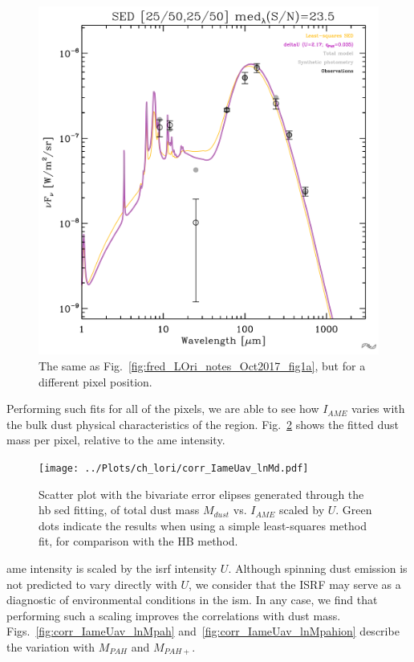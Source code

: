               \begin{figure}
                \includegraphics[width=\textwidth]{../Plots/ch_lori/fred_LOri_notes_Oct2017_fig1b.pdf}
                \centering
                \caption{The same as Fig.~\ref{fig:fred_LOri_notes_Oct2017_fig1a}, but for a different pixel position.}
                \label{fig:fred_LOri_notes_Oct2017_fig1b}
              \end{figure}
           Performing such fits for all of the pixels, we are able to see how $I_{AME}$ varies with the bulk dust physical characteristics of the region. Fig.~\ref{fig:corr_IameUav_lnMd} shows the fitted dust mass per pixel, relative to the \acrshort{ame} intensity.
                \begin{figure}
                 \texttt{[image: ../Plots/ch\_lori/corr\_IameUav\_lnMd.pdf]}
                 \centering
                 \caption{Scatter plot with the bivariate error elipses generated through the \acrshort{hb} \acrshort{sed} fitting, of total dust mass $M_{dust}$ vs. $I_{AME}$ scaled by $U$. Green dots indicate the results when using a simple least-squares method fit, for comparison with the HB method.}
                 \label{fig:corr_IameUav_lnMd}
               \end{figure}
           \acrshort{ame} intensity is scaled by the \acrshort{isrf} intensity $U$. Although spinning dust emission is not predicted to vary directly with $U$, we consider that the ISRF may serve as a diagnostic of environmental conditions in the \acrshort{ism}. In any case, we find that performing such a scaling improves the correlations with dust mass.   Figs.~\ref{fig:corr_IameUav_lnMpah} and~\ref{fig:corr_IameUav_lnMpahion} describe the variation with $M_{PAH}$ and $M_{PAH+}$.

